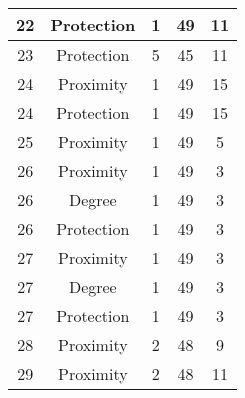 \documentclass[results.tex]{subfiles}
\begin{document}
\begin{center}
\begin{tabular}{| c || c | c | c | c |}
            \hline
            22                      & Protection                   & 1                      & 49                      & 11                   \\
            \hline
            23                      & Protection                   & 5                      & 45                      & 11                   \\
            \hline
            24                      & Proximity                    & 1                      & 49                      & 15                   \\
            \hline
            24                      & Protection                   & 1                      & 49                      & 15                   \\
            \hline
            25                      & Proximity                    & 1                      & 49                      & 5                    \\
            \hline
            26                      & Proximity                    & 1                      & 49                      & 3                    \\
            \hline
            26                      & Degree                       & 1                      & 49                      & 3                    \\
            \hline
            26                      & Protection                   & 1                      & 49                      & 3                    \\
            \hline
            27                      & Proximity                    & 1                      & 49                      & 3                    \\
            \hline
            27                      & Degree                       & 1                      & 49                      & 3                    \\
            \hline
            27                      & Protection                   & 1                      & 49                      & 3                    \\
            \hline
            28                      & Proximity                    & 2                      & 48                      & 9                    \\
            \hline
            29                      & Proximity                    & 2                      & 48                      & 11                   \\

\end{tabular}
\end{center}
\end{document}
